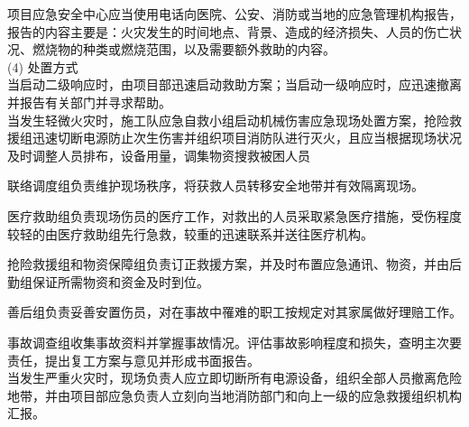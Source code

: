 项目应急安全中心应当使用电话向医院、公安、消防或当地的应急管理机构报告，报告的内容主要是：火灾发生的时间地点、背景、造成的经济损失、人员的伤亡状况、燃烧物的种类或燃烧范围，以及需要额外救助的内容。\\

(4) 处置方式\\

当启动二级响应时，由项目部迅速启动救助方案；当启动一级响应时，应迅速撤离并报告有关部门并寻求帮助。\\

当发生轻微火灾时，施工队应急自救小组启动机械伤害应急现场处置方案，抢险救援组迅速切断电源防止次生伤害并组织项目消防队进行灭火，且应当根据现场状况及时调整人员排布，设备用量，调集物资搜救被困人员

联络调度组负责维护现场秩序，将获救人员转移安全地带并有效隔离现场。

医疗救助组负责现场伤员的医疗工作，对救出的人员采取紧急医疗措施，受伤程度较轻的由医疗救助组先行急救，较重的迅速联系并送往医疗机构。

抢险救援组和物资保障组负责订正救援方案，并及时布置应急通讯、物资，并由后勤组保证所需物资和资金及时到位。

善后组负责妥善安置伤员，对在事故中罹难的职工按规定对其家属做好理赔工作。

事故调查组收集事故资料并掌握事故情况。评估事故影响程度和损失，查明主次要责任，提出复工方案与意见并形成书面报告。\\

当发生严重火灾时，现场负责人应立即切断所有电源设备，组织全部人员撤离危险地带，并由项目部应急负责人立刻向当地消防部门和向上一级的应急救援组织机构汇报。

